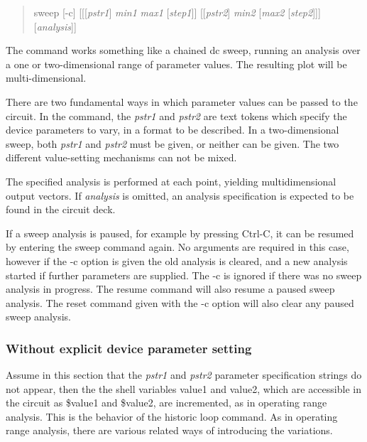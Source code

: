 \begin{quote}\vt
sweep [-c] [[[{\it pstr1\/}] {\it min1} {\it max1\/} [{\it step1\/}]]
 [[{\it pstr2\/}] {\it min2\/} [{\it max2\/} [{\it step2\/}]]]
 [{\it analysis\/}]]
\end{quote}
The command works something like a chained dc sweep, running an
analysis over a one or two-dimensional range of parameter values.  The
resulting plot will be multi-dimensional.

There are two fundamental ways in which parameter values can be passed
to the circuit.  In the command, the {\it pstr1} and {\it pstr2} are
text tokens which specify the device parameters to vary, in a format
to be described.  In a two-dimensional sweep, both {\it pstr1} and
{\it pstr2} must be given, or neither can be given.  The two different
value-setting mechanisms can not be mixed.

The specified analysis is performed at each point, yielding
multidimensional output vectors.  If {\it analysis} is omitted, an
analysis specification is expected to be found in the circuit deck.

If a sweep analysis is paused, for example by pressing {\kb Ctrl-C},
it can be resumed by entering the {\cb sweep} command again.  No
arguments are required in this case, however if the {\vt -c} option is
given the old analysis is cleared, and a new analysis started if
further parameters are supplied.  The {\vt -c} is ignored if there was
no sweep analysis in progress.  The {\cb resume} command will also
resume a paused sweep analysis.  The {\cb reset} command given with
the {\vt -c} option will also clear any paused sweep analysis.

\subsubsection{Without explicit device parameter setting}

Assume in this section that the {\it pstr1} and {\it pstr2} parameter
specification strings do not appear, then the the shell variables {\vt
value1} and {\vt value2}, which are accessible in the circuit as {\vt
\$value1} and {\vt \$value2}, are incremented, as in operating range
analysis.  This is the behavior of the historic {\cb loop} command. 
As in operating range analysis, there are various related ways of
introducing the variations.

